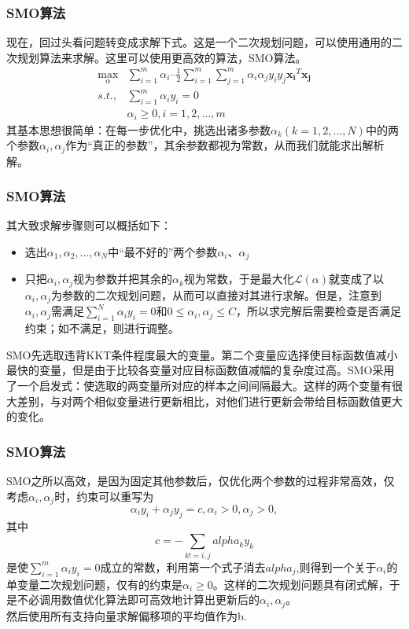 \begin{frame}

\frametitle{SMO算法}
现在，回过头看问题转变成求解下式。这是一个二次规划问题，可以使用通用的二次规划算法来求解。这里可以使用更高效的算法，SMO算法。
\begin{align*}
 \max_\alpha &\sum_{i=1}^m\alpha_i – \frac{1}{2}\sum_{i=1}^m\sum_{j=1}^m\alpha_i\alpha_jy_iy_j\boldsymbol{x_i}^T\boldsymbol{x_j} \\ 
 s.t.,&\sum_{i=1}^m\alpha_iy_i = 0 \\
  &\alpha_i\geq 0, i=1,2,\ldots,m
 \end{align*}
其基本思想很简单：在每一步优化中，挑选出诸多参数$\alpha_k(k=1,2,...,N)$中的两个参数$\alpha_i,\alpha_j$作为“真正的参数”，其余参数都视为常数，从而我们就能求出解析解。

\end{frame}

\begin{frame}

\frametitle{SMO算法}

其大致求解步骤则可以概括如下：
	\begin{itemize}
		\item 选出$\alpha_1,\alpha_2,...,\alpha_N$中“最不好的”两个参数$\alpha_i、\alpha_j$
		\item 只把$\alpha_i,\alpha_j$视为参数并把其余的$\alpha_k$视为常数，于是最大化$\mathcal{L}(\alpha)$就变成了以$\alpha_i,\alpha_j$为参数的二次规划问题，从而可以直接对其进行求解。但是，注意到$\alpha_i,\alpha_j$需满足$\sum_{i=1}^N\alpha_iy_i=0$和$0\le\alpha_i,\alpha_j\le C$，所以求完解后需要检查是否满足约束；如不满足，则进行调整。
	\end{itemize}
 \vspace{1em}
SMO先选取违背KKT条件程度最大的变量。第二个变量应选择使目标函数值减小最快的变量，但是由于比较各变量对应目标函数值减幅的复杂度过高。SMO采用了一个启发式：使选取的两变量所对应的样本之间间隔最大。这样的两个变量有很大差别，与对两个相似变量进行更新相比，对他们进行更新会带给目标函数值更大的变化。
\end{frame}

\begin{frame}

\frametitle{SMO算法}
SMO之所以高效，是因为固定其他参数后，仅优化两个参数的过程非常高效，仅考虑$\alpha_i,\alpha_j$时，约束可以重写为
\[
\alpha_iy_i+\alpha_jy_j= c,\alpha_i>0,\alpha_j>0,
\]
其中
\[
c = -\sum_{k!=i,j}alpha_ky_k
\]
是使$\sum_{i=1}^m\alpha_iy_i=0$成立的常数，利用第一个式子消去$alpha_j$,则得到一个关于$\alpha_i$的单变量二次规划问题，仅有的约束是$\alpha_i\ge0$。这样的二次规划问题具有闭式解，于是不必调用数值优化算法即可高效地计算出更新后的$\alpha_i,\alpha_j$。\\
然后使用所有支持向量求解偏移项的平均值作为b.


\end{frame}

